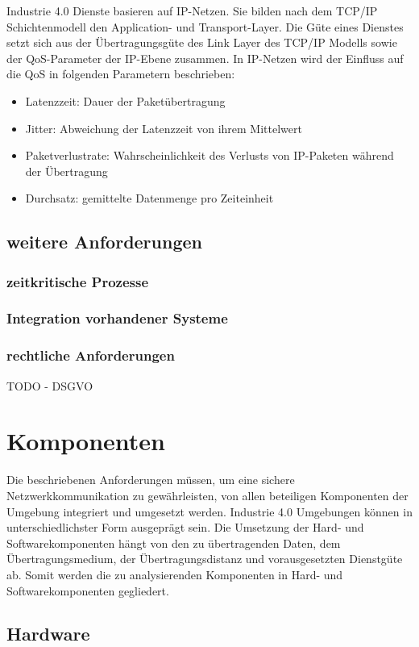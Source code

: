 Industrie 4.0 Dienste basieren auf IP-Netzen. Sie bilden nach dem TCP/IP Schichtenmodell den Application- und Transport-Layer. Die Güte eines Dienstes setzt sich aus der Übertragungsgüte des Link Layer des TCP/IP Modells sowie der \ac{QoS}-Parameter der IP-Ebene zusammen. In IP-Netzen wird der Einfluss auf die \ac{QoS} in folgenden Parametern beschrieben:
\begin{itemize}
    \item Latenzzeit: Dauer der Paketübertragung
    \item Jitter: Abweichung der Latenzzeit von ihrem Mittelwert
    \item Paketverlustrate: Wahrscheinlichkeit des Verlusts von IP-Paketen während der Übertragung
    \item Durchsatz: gemittelte Datenmenge pro Zeiteinheit
\end{itemize}

\subsection{weitere Anforderungen}

\subsubsection{zeitkritische Prozesse}
\subsubsection{Integration vorhandener Systeme}
\subsubsection{rechtliche Anforderungen}
TODO - DSGVO

\section{Komponenten}
Die beschriebenen Anforderungen müssen, um eine sichere Netzwerkkommunikation zu gewährleisten, von allen beteiligen Komponenten der Umgebung integriert und umgesetzt werden. Industrie 4.0 Umgebungen können in unterschiedlichster Form ausgeprägt sein. Die Umsetzung der Hard- und Softwarekomponenten hängt von den zu übertragenden Daten, dem Übertragungsmedium, der Übertragungsdistanz und vorausgesetzten Dienstgüte ab. Somit werden die zu analysierenden Komponenten in Hard- und Softwarekomponenten gegliedert.

\subsection{Hardware}

